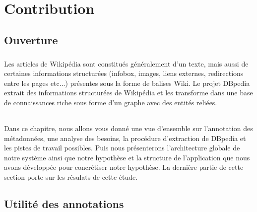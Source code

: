 \documentclass[12pt,a4	]{report}
\begin{document}
\chapter{Contribution}
\section{Ouverture}
\paragraph{}
Les articles de Wikipédia sont constitués généralement d'un texte, mais aussi de certaines informations structurées (infobox, images, liens externes, redirections entre les pages etc...) présentes sous la forme de balises Wiki. 
Le projet DBpedia extrait des informations structurées de Wikipédia et les transforme dans une base de connaissances riche sous forme d'un graphe avec des entités reliées.
\subparagraph{}
Dans ce chapitre, nous allons vous donné une vue d'ensemble sur l'annotation des métadonnées, une analyse des besoins, la procédure d'extraction de DBpedia et les pistes de travail possibles. Puis nous présenterons l'architecture globale de notre système ainsi que notre hypothèse et la structure de l'application que nous avons développée pour concrétiser notre hypothèse. La dernière partie de cette section porte sur les résulats de cette étude.
\section{Utilité des annotations}
\end{document}
